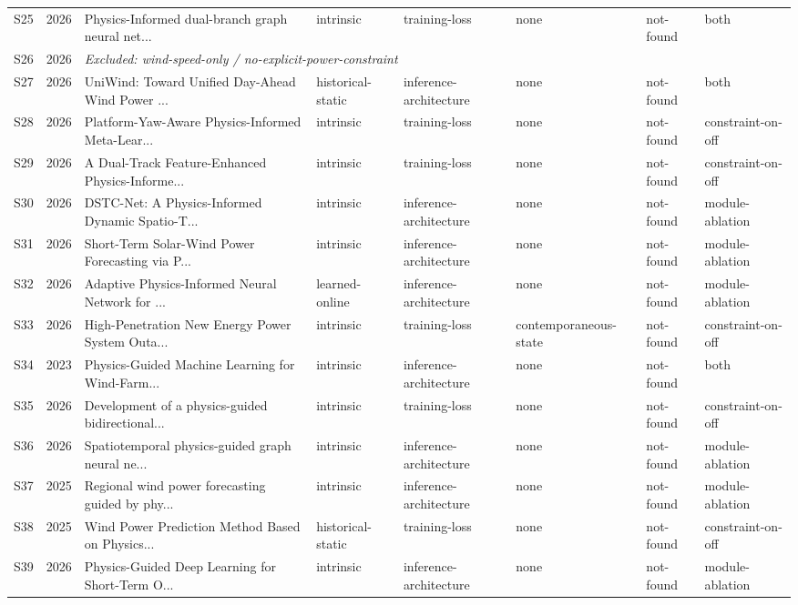\documentclass[3p,times]{elsarticle}
\begin{document}
\begin{longtable}{lp{0.7cm}p{3.8cm}p{1.6cm}p{2.0cm}p{1.5cm}p{1.4cm}p{1.6cm}}
S25 & 2026 & Physics-Informed dual-branch graph neural net... & intrinsic & training-loss & none & not-found & both \\
S26 & 2026 & \multicolumn{6}{l}{\textit{Excluded: wind-speed-only / no-explicit-power-constraint}} \\
S27 & 2026 & UniWind: Toward Unified Day-Ahead Wind Power ... & historical-static & inference-architecture & none & not-found & both \\
S28 & 2026 & Platform-Yaw-Aware Physics-Informed Meta-Lear... & intrinsic & training-loss & none & not-found & constraint-on-off \\
S29 & 2026 & A Dual-Track Feature-Enhanced Physics-Informe... & intrinsic & training-loss & none & not-found & constraint-on-off \\
S30 & 2026 & DSTC-Net: A Physics-Informed Dynamic Spatio-T... & intrinsic & inference-architecture & none & not-found & module-ablation \\
S31 & 2026 & Short-Term Solar-Wind Power Forecasting via P... & intrinsic & inference-architecture & none & not-found & module-ablation \\
S32 & 2026 & Adaptive Physics-Informed Neural Network for ... & learned-online & inference-architecture & none & not-found & module-ablation \\
S33 & 2026 & High-Penetration New Energy Power System Outa... & intrinsic & training-loss & contemporaneous-state & not-found & constraint-on-off \\
S34 & 2023 & Physics-Guided Machine Learning for Wind-Farm... & intrinsic & inference-architecture & none & not-found & both \\
S35 & 2026 & Development of a physics-guided bidirectional... & intrinsic & training-loss & none & not-found & constraint-on-off \\
S36 & 2026 & Spatiotemporal physics-guided graph neural ne... & intrinsic & inference-architecture & none & not-found & module-ablation \\
S37 & 2025 & Regional wind power forecasting guided by phy... & intrinsic & inference-architecture & none & not-found & module-ablation \\
S38 & 2025 & Wind Power Prediction Method Based on Physics... & historical-static & training-loss & none & not-found & constraint-on-off \\
S39 & 2026 & Physics-Guided Deep Learning for Short-Term O... & intrinsic & inference-architecture & none & not-found & module-ablation \\

\end{longtable}
\end{document}
